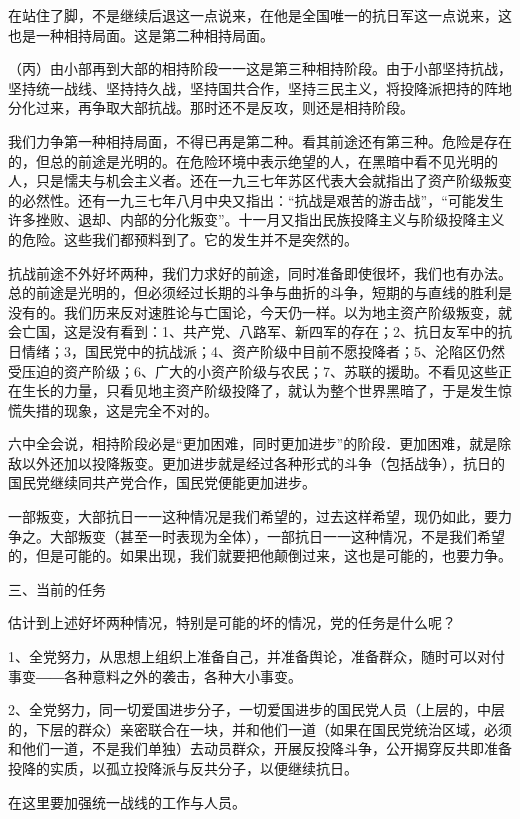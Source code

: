 在站住了脚，不是继续后退这一点说来，在他是全国唯一的抗日军这一点说来，这也是一种相持局面。这是第二种相持局面。

（丙）由小部再到大部的相持阶段一一这是第三种相持阶段。由于小部坚持抗战，坚持统一战线、坚持持久战，坚持国共合作，坚持三民主义，将投降派把持的阵地分化过来，再争取大部抗战。那时还不是反攻，则还是相持阶段。

我们力争第一种相持局面，不得已再是第二种。看其前途还有第三种。危险是存在的，但总的前途是光明的。在危险环境中表示绝望的人，在黑暗中看不见光明的人，只是懦夫与机会主义者。还在一九三七年苏区代表大会就指出了资产阶级叛变的必然性。还有一九三七年八月中央又指出：“抗战是艰苦的游击战”，“可能发生许多挫败、退却、内部的分化叛变”。十一月又指出民族投降主义与阶级投降主义的危险。这些我们都预料到了。它的发生并不是突然的。

抗战前途不外好坏两种，我们力求好的前途，同时准备即使很坏，我们也有办法。总的前途是光明的，但必须经过长期的斗争与曲折的斗争，短期的与直线的胜利是没有的。我们历来反对速胜论与亡国论，今天仍一样。以为地主资产阶级叛变，就会亡国，这是没有看到：1、共产党、八路军、新四军的存在；2、抗日友军中的抗日情绪；3，国民党中的抗战派；4、资产阶级中目前不愿投降者；5、沦陷区仍然受压迫的资产阶级；6、广大的小资产阶级与农民；7、苏联的援助。不看见这些正在生长的力量，只看见地主资产阶级投降了，就认为整个世界黑暗了，于是发生惊慌失措的现象，这是完全不对的。

六中全会说，相持阶段必是“更加困难，同时更加进步”的阶段．更加困难，就是除敌以外还加以投降叛变。更加进步就是经过各种形式的斗争（包括战争），抗日的国民党继续同共产党合作，国民党便能更加进步。

一部叛变，大部抗日一一这种情况是我们希望的，过去这样希望，现仍如此，要力争之。大部叛变（甚至一时表现为全体），一部抗日一一这种情况，不是我们希望的，但是可能的。如果出现，我们就要把他颠倒过来，这也是可能的，也要力争。

三、当前的任务

估计到上述好坏两种情况，特别是可能的坏的情况，党的任务是什么呢？

1、全党努力，从思想上组织上准备自己，并准备舆论，准备群众，随时可以对付事变――各种意料之外的袭击，各种大小事变。

2、全党努力，同一切爱国进步分子，一切爱国进步的国民党人员（上层的，中层的，下层的群众）亲密联合在一块，并和他们一道（如果在国民党统治区域，必须和他们一道，不是我们单独）去动员群众，开展反投降斗争，公开揭穿反共即准备投降的实质，以孤立投降派与反共分子，以便继续抗日。

在这里要加强统一战线的工作与人员。

